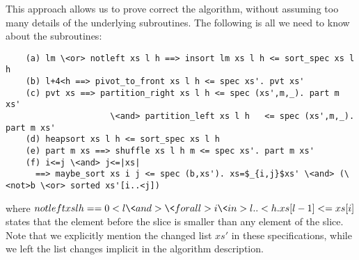 \documentclass[runningheads]{llncs}
\begin{document}
  This approach allows us to prove correct the algorithm, without assuming too many details of the underlying subroutines.
  The following is all we need to know about the subroutines:
  \begin{lstlisting}
    (a) lm \<or> notleft xs l h ==> insort lm xs l h <= sort_spec xs l h
    (b) l+4<h ==> pivot_to_front xs l h <= spec xs'. pvt xs'
    (c) pvt xs ==> partition_right xs l h <= spec (xs',m,_). part m xs'
                     \<and> partition_left xs l h   <= spec (xs',m,_). part m xs'
    (d) heapsort xs l h <= sort_spec xs l h
    (e) part m xs ==> shuffle xs l h m <= spec xs'. part m xs'
    (f) i<=j \<and> j<=|xs|
      ==> maybe_sort xs i j <= spec (b,xs'). xs=$_{i,j}$xs' \<and> (\<not>b \<or> sorted xs'[i..<j])
  \end{lstlisting}
  where \is$notleft xs l h == 0<l \<and> \<forall>i \<in> l..<h. xs[l-1] <= xs[i]$
  states that the element  before the slice is smaller than any element of the slice.
  Note that we explicitly mention the changed list $xs'$ in these specifications, while we left the list changes implicit in the algorithm description.
\end{document}
